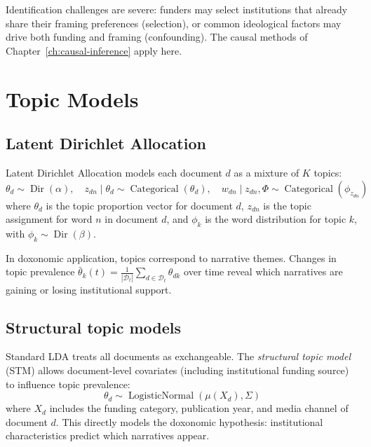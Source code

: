 Identification challenges are severe: funders may select institutions that already share their framing preferences (selection), or common ideological factors may drive both funding and framing (confounding).
The causal methods of Chapter~\ref{ch:causal-inference} apply here.

\section{Topic Models}
\label{sec:ch17-topic-models}

\subsection{Latent Dirichlet Allocation}

\begin{model}
\label{mod:lda}
Latent Dirichlet Allocation \autocite{blei2003} models each document $d$ as a mixture of $K$ topics:
\[
  \theta_d \sim \operatorname{Dir}(\alpha), \quad z_{dn} \mid \theta_d \sim \operatorname{Categorical}(\theta_d), \quad w_{dn} \mid z_{dn}, \Phi \sim \operatorname{Categorical}(\phi_{z_{dn}})
\]
where $\theta_d$ is the topic proportion vector for document $d$, $z_{dn}$ is the topic assignment for word $n$ in document $d$, and $\phi_k$ is the word distribution for topic $k$, with $\phi_k \sim \operatorname{Dir}(\beta)$.

In doxonomic application, topics correspond to narrative themes.
Changes in topic prevalence $\bar{\theta}_k(t) = \frac{1}{|\mathcal{D}_t|}\sum_{d \in \mathcal{D}_t} \theta_{dk}$ over time reveal which narratives are gaining or losing institutional support.
\end{model}

\subsection{Structural topic models}

Standard LDA treats all documents as exchangeable.
The \emph{structural topic model} (STM) allows document-level covariates (including institutional funding source) to influence topic prevalence:
\[
  \theta_d \sim \operatorname{LogisticNormal}(\mu(X_d), \Sigma)
\]
where $X_d$ includes the funding category, publication year, and media channel of document $d$.
This directly models the doxonomic hypothesis: institutional characteristics predict which narratives appear.

